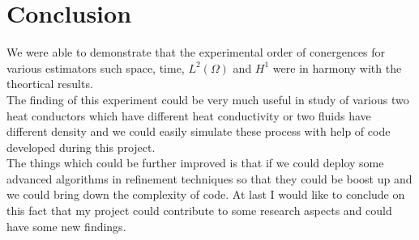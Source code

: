 \documentclass{report}
\numberwithin{equation}{chapter}
\begin{document}
\chapter{Conclusion}
\begin{spacing}{1.5}
We were able to demonstrate that the experimental order of conergences for various estimators such space, time, $L^{2}(\Omega)$ and $H^{1}$ were in harmony with the theortical results.\\
The finding of this experiment could be very much useful in study of various two heat conductors which have different heat conductivity or two fluids have different density and we could easily simulate these process with help of code developed during this project.\\
The things which could be further improved is that if we could deploy some advanced algorithms in refinement techniques so that they could be boost up and we could bring down the complexity of code. At last I would like to conclude on this fact that my project could contribute to some research aspects and could have some new findings.
\end{spacing}
\newpage
\end{document}
